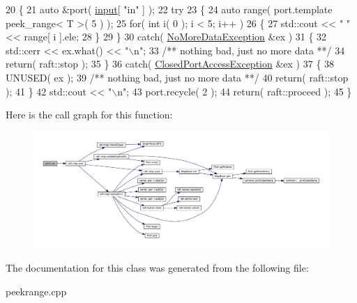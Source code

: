 \begin{DoxyCode}
20    \{
21       \textcolor{keyword}{auto} &port( \hyperlink{classraft_1_1kernel_a6edbe35a56409d402e719b3ac36d6554}{input}[ \textcolor{stringliteral}{"in"} ] );
22       \textcolor{keywordflow}{try}
23       \{
24          \textcolor{keyword}{auto} range( port.template peek\_range< T >( 5 ) );
25          \textcolor{keywordflow}{for}( \textcolor{keywordtype}{int} i( 0 ); i < 5; i++ )
26          \{
27             std::cout << \textcolor{stringliteral}{" "} << range[ i ].ele;
28          \}
29       \} 
30       \textcolor{keywordflow}{catch}( \hyperlink{class_no_more_data_exception}{NoMoreDataException} &ex )
31       \{
32          std::cerr << ex.what() << \textcolor{stringliteral}{"\(\backslash\)n"};\textcolor{comment}{}
33 \textcolor{comment}{         /** nothing bad, just no more data **/}
34          \textcolor{keywordflow}{return}( raft::stop );
35       \}
36       \textcolor{keywordflow}{catch}( \hyperlink{class_closed_port_access_exception}{ClosedPortAccessException} &ex )
37       \{
38          UNUSED( ex );\textcolor{comment}{}
39 \textcolor{comment}{         /** nothing bad, just no more data **/}
40          \textcolor{keywordflow}{return}( raft::stop );
41       \}
42       std::cout << \textcolor{stringliteral}{"\(\backslash\)n"};
43       port.recycle( 2 );
44       \textcolor{keywordflow}{return}( raft::proceed );
45    \}
\end{DoxyCode}
Here is the call graph for this function\+:
\nopagebreak
\begin{figure}[H]
\begin{center}
\leavevmode
\includegraphics[width=350pt]{classprint_aa547f61c584b4044e4a0dfc2410e5adc_cgraph}
\end{center}
\end{figure}


The documentation for this class was generated from the following file\+:\begin{DoxyCompactItemize}
\item 
peekrange.\+cpp\end{DoxyCompactItemize}
